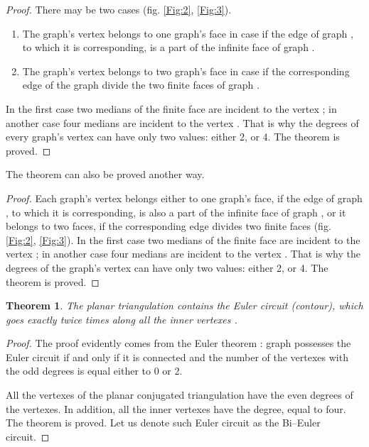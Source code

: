 \documentclass{amsart}
\newtheorem{theorem}{Theorem}
\theoremstyle{plain}
\numberwithin{equation}{section}
\begin{document}
\begin {proof}
There may be two cases (fig. \ref{Fig:2}, \ref{Fig:3}).
\begin{enumerate}
\item	
The graph's  vertex  belongs to one graph's  face in case if the edge  of graph , to which it is corresponding, is a part of the infinite face of graph .
\item	
The graph's  vertex  belongs to two graph's  face in case if the corresponding edge  of the graph  divide the two finite faces of graph .
\end{enumerate}
	
In the first case two medians of the finite face are incident to the vertex ; in another case four medians are incident to the vertex . That is why the degrees of every graph's  vertex  can have only two values: either 2, or 4. The theorem is proved.
\end {proof}

The theorem can also be proved another way.

\begin {proof}
Each graph's  vertex  belongs either to one graph's  face, if the edge  of graph , to which it is corresponding, is also a part of the infinite face of graph , or it belongs to two faces, if the corresponding edge divides two finite faces (fig. \ref{Fig:2}, \ref{Fig:3}). In the first case two medians of the finite face are incident to the vertex ; in another case four medians are incident to the vertex . That is why the degrees of the graph's  vertex  can have only two values: either 2, or 4. The theorem is proved.
\end {proof}

\begin{theorem}
The planar triangulation  contains the Euler circuit (contour), which goes exactly twice times along all the inner vertexes .
\end {theorem}

\begin {proof}
The proof evidently comes from the Euler theorem \cite {Berge}: graph possesses the Euler circuit if and only if it is connected and the number of the vertexes with the odd degrees is equal either to 0 or 2. 

All the vertexes of the planar conjugated triangulation have the even degrees of the vertexes. In addition, all the inner vertexes have the degree, equal to four. The theorem is proved. Let us denote such Euler circuit as the Bi--Euler circuit.
\end {proof}
\end{document}
